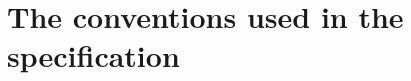 
\begin{comment}
\clearpage
\begin{informative*}
\section{Overview of Dirac video coding (Informative)}
\end{informative*}
\end{comment}


\clearpage
\section{The conventions used in the specification}

